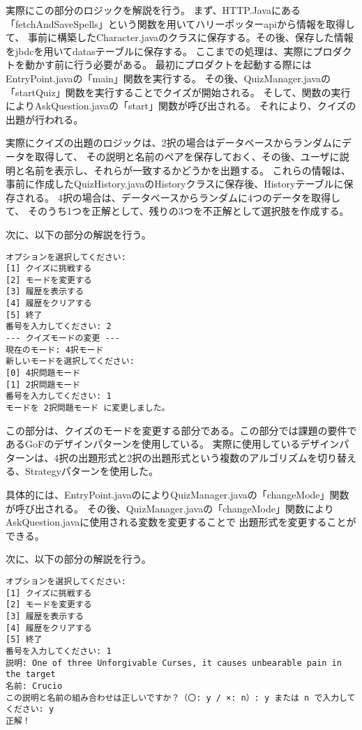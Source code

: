 \documentclass[uplatex,dvipdfmx,a4paper]{jsarticle}
\begin{document}
\par 実際にこの部分のロジックを解説を行う。
まず、HTTP.Javaにある「fetchAndSaveSpells」という関数を用いてハリーポッターapiから情報を取得して、
事前に構築したCharacter.javaのクラスに保存する。その後、保存した情報をjbdcを用いてdatasテーブルに保存する。
ここまでの処理は、実際にプロダクトを動かす前に行う必要がある。
最初にプロダクトを起動する際にはEntryPoint.javaの「main」関数を実行する。
その後、QuizManager.javaの「startQuiz」関数を実行することでクイズが開始される。
そして、関数の実行によりAskQuestion.javaの「start」関数が呼び出される。
それにより、クイズの出題が行われる。
\par 実際にクイズの出題のロジックは、2択の場合はデータベースからランダムにデータを取得して、
その説明と名前のペアを保存しておく、その後、ユーザに説明と名前を表示し、それらが一致するかどうかを出題する。
これらの情報は、事前に作成したQuizHistory.javaのHistoryクラスに保存後、Historyテーブルに保存される。 4択の場合は、データベースからランダムに4つのデータを取得して、
そのうち1つを正解として、残りの3つを不正解として選択肢を作成する。
\par 次に、以下の部分の解説を行う。
\begin{lstlisting}[style=result]
  オプションを選択してください:
[1] クイズに挑戦する
[2] モードを変更する
[3] 履歴を表示する
[4] 履歴をクリアする
[5] 終了
番号を入力してください: 2
--- クイズモードの変更 ---
現在のモード: 4択モード
新しいモードを選択してください:
[0] 4択問題モード
[1] 2択問題モード
番号を入力してください: 1
モードを 2択問題モード に変更しました。  
\end{lstlisting}
\par この部分は、クイズのモードを変更する部分である。この部分では課題の要件であるGoFのデザインパターンを使用している。
実際に使用しているデザインパターンは、4択の出題形式と2択の出題形式という複数のアルゴリズムを切り替える、Strategyパターンを使用した。
\par 具体的には、EntryPoint.javaのによりQuizManager.javaの「changeMode」関数が呼び出される。
その後、QuizManager.javaの「changeMode」関数によりAskQuestion.javaに使用される変数を変更することで
出題形式を変更することができる。
\par 次に、以下の部分の解説を行う。
\begin{lstlisting}[style=result]
  オプションを選択してください:
[1] クイズに挑戦する
[2] モードを変更する
[3] 履歴を表示する
[4] 履歴をクリアする
[5] 終了
番号を入力してください: 1
説明: One of three Unforgivable Curses, it causes unbearable pain in the target
名前: Crucio
この説明と名前の組み合わせは正しいですか？（〇: y / ×: n）: y または n で入力してください: y
正解！
\end{lstlisting}
\end{document}
